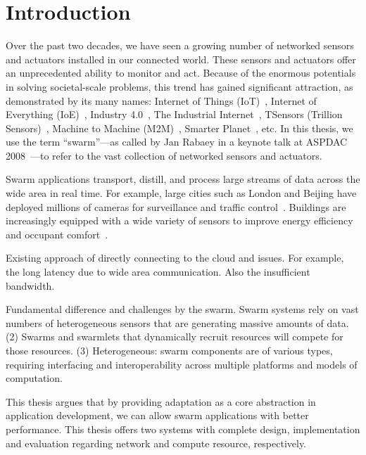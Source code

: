\documentclass[thesis.tex]{subfiles}
\begin{document}
\chapter{Introduction}

Over the past two decades, we have seen a growing number of networked sensors
and actuators installed in our connected world. These sensors and actuators
offer an unprecedented ability to monitor and act. Because of the enormous
potentials in solving societal-scale problems, this trend has gained significant
attraction, as demonstrated by its many names: Internet of Things
(IoT)~\cite{atzori2010internet}, Internet of Everything
(IoE)~\cite{bradley2013internet}, Industry 4.0~\cite{lasi2014industry}, The
Industrial Internet~\cite{eigner2018industrial}, TSensors (Trillion
Sensors)~\cite{bogue2014towards}, Machine to Machine
(M2M)~\cite{anton2014machine}, Smarter Planet~\cite{palmisano2008smarter}, etc.
In this thesis, we use the term ``swarm''---as called by Jan Rabaey in a keynote
talk at ASPDAC 2008~\cite{rabaey2008brand}---to refer to the vast collection of
networked sensors and actuators.

Swarm applications transport, distill, and process large streams of data across
the wide area in real time. For example, large cities such as London and Beijing
have deployed millions of cameras for surveillance and traffic
control~\cite{skynet, london.surveillance}. Buildings are increasingly equipped
with a wide variety of sensors to improve energy efficiency and occupant
comfort~\cite{krioukov2012building}.

Existing approach of directly connecting to the cloud and issues. For example,
the long latency due to wide area communication. Also the insufficient
bandwidth.

Fundamental difference and challenges by the swarm. Swarm systems rely on vast
numbers of heterogeneous sensors that are generating massive amounts of
data. (2) Swarms and swarmlets that dynamically recruit resources will compete
for those resources. (3) Heterogeneous: swarm components are of various types,
requiring interfacing and interoperability across multiple platforms and models
of computation.

This thesis argues that by providing adaptation as a core abstraction in
application development, we can allow swarm applications with better
performance. This thesis offers two systems with complete design, implementation
and evaluation regarding network and compute resource, respectively.
\end{document}
